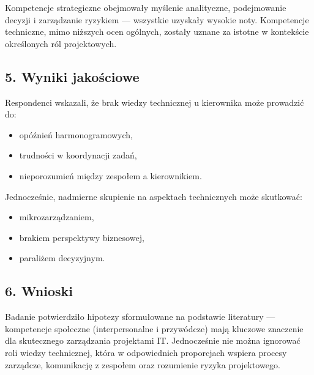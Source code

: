 Kompetencje strategiczne obejmowały myślenie analityczne, podejmowanie decyzji i zarządzanie ryzykiem — wszystkie uzyskały wysokie noty. Kompetencje techniczne, mimo niższych ocen ogólnych, zostały uznane za istotne w kontekście określonych ról projektowych.

\subsection*{5. Wyniki jakościowe}

Respondenci wskazali, że brak wiedzy technicznej u kierownika może prowadzić do:

\begin{itemize}
  \item opóźnień harmonogramowych,
  \item trudności w koordynacji zadań,
  \item nieporozumień między zespołem a kierownikiem.
\end{itemize}

Jednocześnie, nadmierne skupienie na aspektach technicznych może skutkować:

\begin{itemize}
  \item mikrozarządzaniem,
  \item brakiem perspektywy biznesowej,
  \item paraliżem decyzyjnym.
\end{itemize}

\subsection*{6. Wnioski}

Badanie potwierdziło hipotezy sformułowane na podstawie literatury — kompetencje społeczne (interpersonalne i przywódcze) mają kluczowe znaczenie dla skutecznego zarządzania projektami IT. Jednocześnie nie można ignorować roli wiedzy technicznej, która w odpowiednich proporcjach wspiera procesy zarządcze, komunikację z zespołem oraz rozumienie ryzyka projektowego.

\printbibliography



